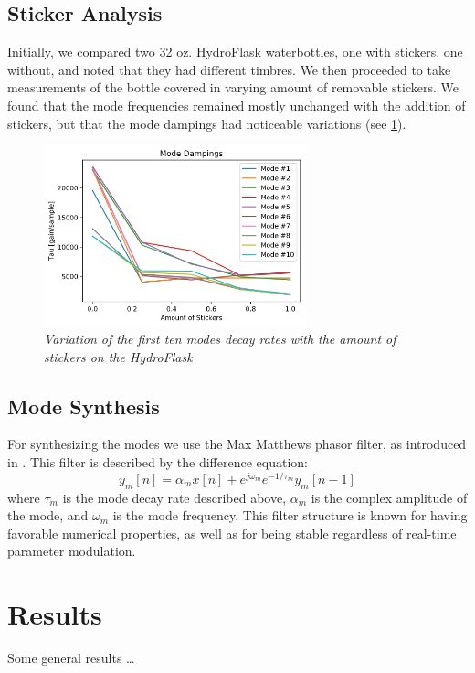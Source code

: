 \documentclass[twoside,a4paper]{article}
\begin{document}
\subsection{Sticker Analysis} \label{sec:sticker}
%
Initially, we compared two 32 oz. HydroFlask waterbottles, one
with stickers, one without, and noted that they had different
timbres. We then proceeded to take measurements of the
bottle covered in varying amount of removable stickers. We found
that the mode frequencies remained mostly unchanged with the
addition of stickers, but that the mode dampings had noticeable
variations (see \cref{fig:sticker-mode-damp}).
%
\begin{figure}[!htb]
    \centering
    \includegraphics[width=3in]{../Figures/StickerDamping}
    \caption{\it{Variation of the first ten modes decay rates
                 with the amount of stickers on the HydroFlask}}
    \label{fig:sticker-mode-damp}
\end{figure}
%
\subsection{Mode Synthesis} \label{sec:synthesis}
%
For synthesizing the modes we use the Max Matthews
phasor filter, as introduced in \cite{phasorfilter}.
This filter is described by the difference equation:
\begin{equation}
    y_m[n] = \alpha_m x[n] + e^{j\omega_m} e^{-1/\tau_m} y_m[n-1]
    \label{eq:phasor}
\end{equation}
%
where $\tau_m$ is the mode decay rate described above,
$\alpha_m$ is the complex amplitude of the mode, and $\omega_m$
is the mode frequency. This filter structure is known for
having favorable numerical properties, as well as for being
stable regardless of real-time parameter modulation.
%
\section{Results} \label{sec:results}
%
Some general results \dots
%
\end{document}
